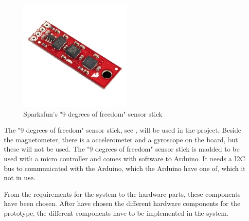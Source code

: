\begin{figure}[H]
	\centering
	\includegraphics[width=0.50\textwidth]{figures/NineDegree}
		\caption{Sparksfun's "9 degrees of freedom" sensor stick} 
	\label{NineDegree}
\end{figure}

The "9 degrees of freedom" sensor stick, see , will be used in the project. Beside the magnetometer, there is a accelerometer and a gyroscope on the board, but these will not be used. The "9 degrees of freedom" sensor stick is madded to be used with a micro controller and comes with software to Arduino. It needs a I2C bus to communicated with the Arduino, which the Arduino have one of, which it not in use.


From the requirements for the system to the hardware parts, these components have been chosen. After have chosen the different hardware components for the prototype, the different components have to be implemented in the system.


